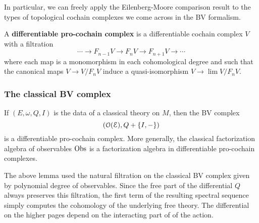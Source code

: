 \documentclass[10pt, oneside]{article}
\begin{document}
In particular, we can freely apply the Eilenberg-Moore comparison result to the types of topological cochain complexes we come across in the BV formalism. 

\begin{definition}\label{dfn: pro}
A {\bf differentiable pro-cochain complex} is a differentiable cochain complex $V$ with a filtration
\[
\cdots \to F_{n-1} V \to F_{n} V \to F_{n+1}V \to \cdots
\]
where each map is a monomorphism in each cohomological degree and such that the canonical maps $V \to V / F_n V$ induce a quasi-isomorphism $V \to \lim V / F_n V$. 
\end{definition}

\subsubsection{The classical BV complex}

\begin{lem}
If $(E, \omega, Q, I)$ is the data of a classical theory on $M$, then the BV complex
\[
\left(\mathcal O(\mathcal E) , Q + \{I,-\}\right)
\]
is a differentiable pro-cochain complex.
More generally, the classical factorization algebra of observables $\mathrm{Obs}$ is a factorization algebra in differentiable pro-cochain complexes. 
\end{lem}

The above lemma used the natural filtration on the classical BV complex given by polynomial degree of observables. 
Since the free part of the differential $Q$ always preserves this filtration, the first term of the resulting spectral sequence simply computes the cohomology of the underlying free theory. 
The differential on the higher pages depend on the interacting part of of the action. 
\end{document}
